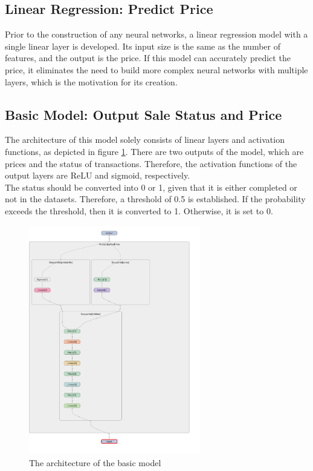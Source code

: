 \documentclass[12pt,twoside]{report}
\begin{document}
\subsection{Linear Regression: Predict Price}
\label{linear_regression_model_construction}
Prior to the construction of any neural networks, a linear regression model with a single linear layer is developed. Its input size is the same as the number of features, and the output is the price. If this model can accurately predict the price, it eliminates the need to build more complex neural networks with multiple layers, which is the motivation for its creation. 

\subsection{Basic Model: Output Sale Status and Price}
\label{basic_model_price_status_construction}
The architecture of this model solely consists of linear layers and activation functions, as depicted in figure \ref{basic_model_layout}. There are two outputs of the model, which are prices and the status of transactions. Therefore, the activation functions of the output layers are ReLU and sigmoid, respectively.
\\

The status should be converted into 0 or 1, given that it is either completed or not in the datasets. Therefore, a threshold of 0.5 is established. If the probability exceeds the threshold, then it is converted to 1. Otherwise, it is set to 0.

\begin{figure}[!htbp]
	\centering
	\includegraphics[height=10cm]{basic_model_layout}
	\caption{The architecture of the basic model}
	\label{basic_model_layout}
\end{figure}
\end{document}

